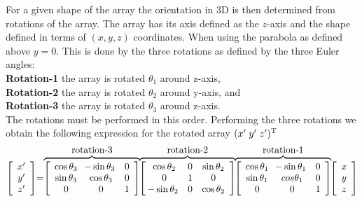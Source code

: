 \documentclass{saclantc}
\begin{document}
For a given shape of the array the orientation in 3D is then determined from  rotations of the
array. The array has its  axis defined as the
$z$-axis and the shape defined in terms of $(x,y,z)$ coordinates.
When using the parabola as defined above $ y=0$. 
 This is done by the three rotations as defined by the three Euler angles\cite{marrion}:\\ 
{\bf Rotation-1} the array is rotated $\theta_1$ around z-axis,\\ 
{\bf Rotation-2} the array is rotated $\theta_2$ around y-axis, and \\
{\bf Rotation-3} the array is rotated $\theta_3$ around z-axis. \\
%
The rotations must be performed in this order. Performing the three
rotations we obtain the following expression for the rotated array 
$ (x'\; y'\; z')^{\rm T}$
\begin{equation}
\left[ \begin{array}{c} x' \\ y' \\z' \end{array}\right]
\hspace{-1mm}= \hspace{-1mm} 
\overbrace{
\left[ \begin{array}{ccc} \cos \theta_3 & \hspace{-1mm} -\sin \theta_3 &0\\
 \sin \theta_3 & \cos \theta_3 & 0\\
0 &0 & 1 \end{array}\right	]
}^{\mbox{rotation-3}}
\hspace{-1mm}
\overbrace{
\left[ \begin{array}{ccc} 
\cos \theta_2 &0 & \sin \theta_2\\
          0   &1 & 0\\
\hspace{-1mm} -\sin \theta_2& 0& \cos \theta_2 \end{array}\right	]
}^{\mbox{rotation-2}}
\hspace{-1mm}
\overbrace{
\left[ \begin{array}{ccc} \cos \theta_1 & \hspace{-1mm} -\sin \theta_1 & 0\\
 \sin \theta_1 & cos \theta_1 & 0\\
0 & 0 & 1 \end{array}\right	]
}^{\mbox{rotation-1}}
\hspace{-1mm} \left[ \begin{array}{c}	 x \\ y \\z \end{array}\right]
\end{equation}
\end{document}
